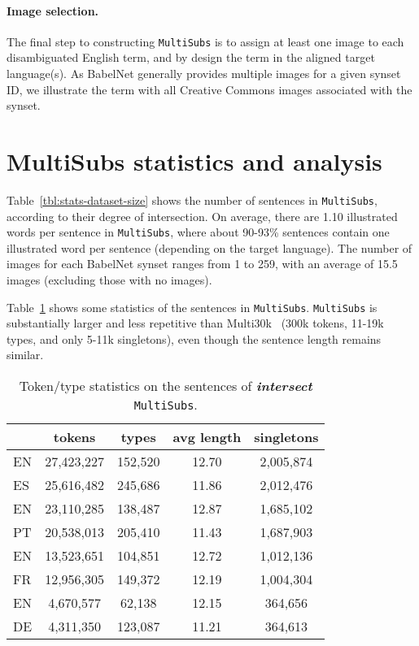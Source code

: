 \documentclass[twocolumn]{svjour3}          \smartqed  \usepackage{graphicx}
\newcommand{\multisubs}{\texttt{MultiSubs}\xspace}
\begin{document}
\paragraph{Image selection.} The final step to constructing \multisubs is to assign at least one image to each disambiguated English term, and by design the term in the aligned target language(s). As BabelNet generally provides multiple images for a given synset ID, we illustrate the term with all Creative Commons images associated with the synset.

\section{MultiSubs statistics and analysis}
\label{sec:statistics}

Table~\ref{tbl:stats-dataset-size} shows the number of sentences in \multisubs, according to their degree of intersection. On average, there are 1.10 illustrated words per sentence in \multisubs, where about 90-93\% sentences contain one illustrated word per sentence (depending on the target language). The number of images for each BabelNet synset ranges from 1 to 259, with an average of 15.5 images (excluding those with no images). 

Table~\ref{tbl:tokentype} shows some statistics of the sentences in \multisubs. \multisubs is substantially larger and less repetitive than Multi30k~\cite{ElliottEtAl:2016} (300k tokens, 11-19k types, and only 5-11k singletons), even though the sentence length remains similar.



\begin{table}
\caption{Token/type statistics on the sentences of \textbf{\textit{intersect}} \multisubs.}
\label{tbl:tokentype}
\small
\centering
\begin{tabular}{lcccc}
\toprule
& \textbf{tokens} & \textbf{types} & \textbf{avg length} & {\bf singletons} \\
\midrule
EN & 27,423,227 & 152,520 & 12.70 & 2,005,874\\
ES & 25,616,482 & 245,686 & 11.86 & 2,012,476\\
\midrule
EN & 23,110,285 & 138,487 & 12.87 & 1,685,102\\
PT & 20,538,013 & 205,410 & 11.43 & 1,687,903\\
\midrule
EN & 13,523,651 & 104,851 & 12.72 & 1,012,136\\
FR & 12,956,305 & 149,372 & 12.19 & 1,004,304\\
\midrule
EN & 4,670,577 & 62,138 & 12.15 & 364,656\\
DE & 4,311,350 & 123,087 & 11.21 & 364,613\\
\bottomrule
\end{tabular}
\end{table}
\end{document}
